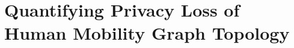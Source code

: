 \chapter{Quantifying Privacy Loss of Human Mobility Graph Topology}
\usetikzlibrary{positioning}
\newcommand*{\MyPath}{../Chapter3}%







